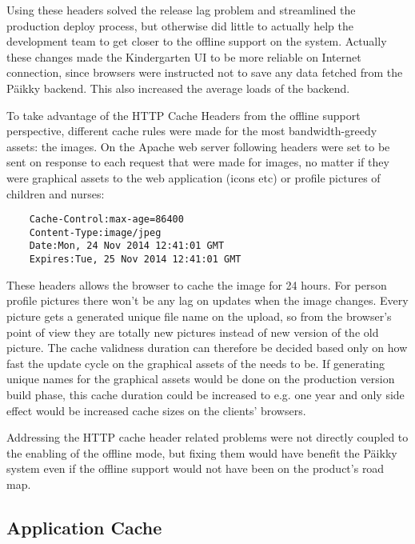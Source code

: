 Using these headers solved the release lag problem and streamlined the production deploy process, but otherwise did little to actually help the development team to get closer to the offline support on the system. Actually these changes made the Kindergarten UI to be more reliable on Internet connection, since browsers were instructed not to save any data fetched from the Päikky backend. This also increased the average loads of the backend.

To take advantage of the HTTP Cache Headers from the offline support perspective, different cache rules were made for the most bandwidth-greedy assets: the images. On the Apache web server following headers were set to be sent on response to each request that were made for images, no matter if they were graphical assets to the web application (icons etc) or profile pictures of children and nurses:

\begin{lstlisting}
    Cache-Control:max-age=86400
    Content-Type:image/jpeg
    Date:Mon, 24 Nov 2014 12:41:01 GMT
    Expires:Tue, 25 Nov 2014 12:41:01 GMT
\end{lstlisting}
%
\noindent These headers allows the browser to cache the image for 24 hours. For person profile pictures there won't be any lag on updates when the image changes. Every picture gets a generated unique file name on the upload, so from the browser's point of view they are totally new pictures instead of new version of the old picture. The cache validness duration can therefore be decided based only on how fast the update cycle on the graphical assets of the needs to be. If generating unique names for the graphical assets would be done on the production version build phase, this cache duration could be increased to e.g. one year and only side effect would be increased cache sizes on the clients' browsers.

Addressing the HTTP cache header related problems were not directly coupled to the enabling of the offline mode, but fixing them would have benefit the Päikky system even if the offline support would not have been on the product's road map.







\subsection{Application Cache}

